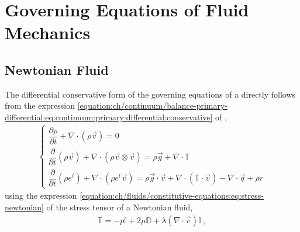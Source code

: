 \documentclass[letterpaper,10pt,english]{jupyterBook}
\begin{document}
\sphinxstepscope


\chapter{Governing Equations of Fluid Mechanics}
\label{\detokenize{ch/fluids/governing-equations:governing-equations-of-fluid-mechanics}}\label{\detokenize{ch/fluids/governing-equations:fluid-mechanics-governing-equations}}\label{\detokenize{ch/fluids/governing-equations::doc}}

\section{Newtonian Fluid}
\label{\detokenize{ch/fluids/governing-equations:newtonian-fluid}}
\sphinxAtStartPar
The differential conservative form of the governing equations of a {\hyperref[\detokenize{ch/fluids/constitutive-equations:fluid-mechanics-constutive-equations-newtonian}]{}} directly follows from the expression \eqref{equation:ch/continuum/balance-primary-differential:eq:continuum:primary:differential:conservative} of {\hyperref[\detokenize{ch/continuum/balance-primary-integral:continuum-governing-equations-primary-integral}]{}},
\begin{equation*}
\begin{split}\begin{cases}
  \dfrac{\partial \rho }{\partial t} + \nabla \cdot \left( \rho \vec{v} \right) = 0 \\
  \dfrac{\partial }{\partial t} \left( \rho \vec{v} \right) +  \nabla \cdot \left( \rho \vec{v} \otimes \vec{v} \right) = \rho \vec{g} + \nabla \cdot \mathbb{T} \\
  \dfrac{\partial}{\partial t}  \left( \rho e^t \right) + \nabla \cdot \left( \rho e^t \vec{v} \right) = \rho \vec{g} \cdot \vec{v} + \nabla \cdot \left( \mathbb{T} \cdot \vec{v} \right) - \nabla \cdot \vec{q} + \rho r
\end{cases}\end{split}
\end{equation*}
\sphinxAtStartPar
using the expression \eqref{equation:ch/fluids/constitutive-equations:eq:stress-newtonian} of the stress tensor of a Newtonian fluid,
\begin{equation*}
\begin{split}\mathbb{T} = - p \mathbb{I} + 2 \mu \mathbb{D} + \lambda (\nabla \cdot \vec{v}) \mathbb{I} \ ,\end{split}
\end{equation*}
\end{document}
